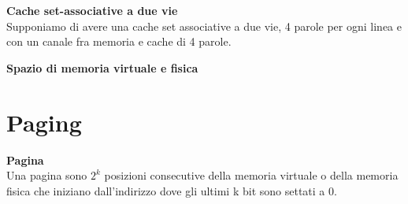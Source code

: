 \begin{defn}
    \textbf{Cache set-associative a due vie} \\
    Supponiamo di avere una cache set associative a due vie, 4 parole per ogni
    linea e con un canale fra memoria e cache di 4 parole.
\end{defn}



\begin{defn}
    \textbf{Spazio di memoria virtuale e fisica} \\
\end{defn}

\section{Paging}

\begin{defn}
    \textbf{Pagina} \\
    Una pagina sono $2^k$ posizioni consecutive della memoria virtuale o della
    memoria fisica che iniziano dall'indirizzo dove gli ultimi k bit sono
    settati a 0.
\end{defn}
